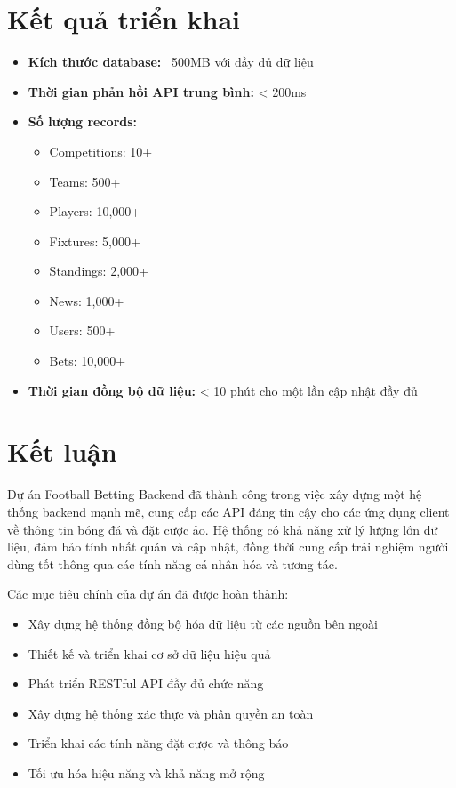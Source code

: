 \documentclass[a4paper,12pt]{report}
\begin{document}
\section{Kết quả triển khai}

\begin{itemize}
    \item \textbf{Kích thước database:} ~500MB với đầy đủ dữ liệu
    \item \textbf{Thời gian phản hồi API trung bình:} < 200ms
    \item \textbf{Số lượng records:}
    \begin{itemize}
        \item Competitions: 10+
        \item Teams: 500+
        \item Players: 10,000+
        \item Fixtures: 5,000+
        \item Standings: 2,000+
        \item News: 1,000+
        \item Users: 500+
        \item Bets: 10,000+
    \end{itemize}
    \item \textbf{Thời gian đồng bộ dữ liệu:} < 10 phút cho một lần cập nhật đầy đủ
\end{itemize}

\section{Kết luận}

Dự án Football Betting Backend đã thành công trong việc xây dựng một hệ thống backend mạnh mẽ, cung cấp các API đáng tin cậy cho các ứng dụng client về thông tin bóng đá và đặt cược ảo. Hệ thống có khả năng xử lý lượng lớn dữ liệu, đảm bảo tính nhất quán và cập nhật, đồng thời cung cấp trải nghiệm người dùng tốt thông qua các tính năng cá nhân hóa và tương tác.

Các mục tiêu chính của dự án đã được hoàn thành:
\begin{itemize}
    \item Xây dựng hệ thống đồng bộ hóa dữ liệu từ các nguồn bên ngoài
    \item Thiết kế và triển khai cơ sở dữ liệu hiệu quả
    \item Phát triển RESTful API đầy đủ chức năng
    \item Xây dựng hệ thống xác thực và phân quyền an toàn
    \item Triển khai các tính năng đặt cược và thông báo
    \item Tối ưu hóa hiệu năng và khả năng mở rộng
\end{itemize}
\end{document}
